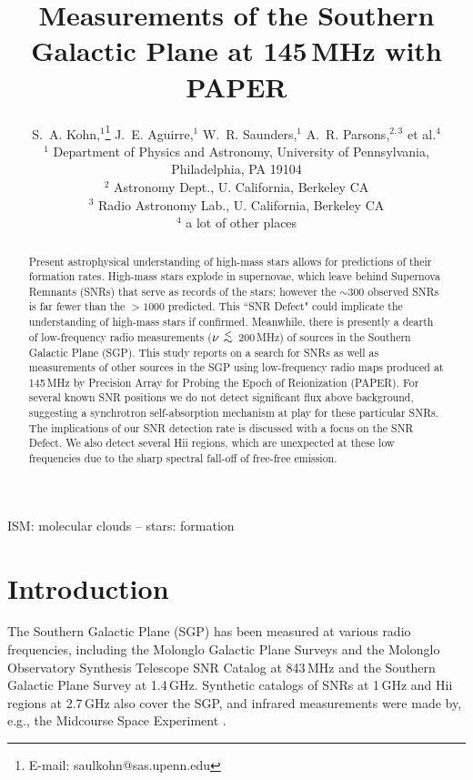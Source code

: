 \documentclass[useAMS,usenatbib]{mn2e}
\title[The SGP at 145\,MHz with PAPER]{Measurements of the Southern Galactic Plane at 145\,MHz with PAPER}
\author[S. A. Kohn et al.]{S.~A. Kohn,$^{1}$\thanks{E-mail: saulkohn@sas.upenn.edu} J.~E. Aguirre,$^{1}$ W.~R. Saunders,$^{1}$
A.~R. Parsons,$^{2,3}$
\newauthor et al.$^4$\\
$^{1}$ Department of Physics and Astronomy, University of Pennsylvania, Philadelphia, PA 19104\\
$^{2}$ Astronomy Dept., U. California, Berkeley CA\\
$^{3}$ Radio Astronomy Lab., U. California, Berkeley CA\\
$^{4}$ a lot of other places\\
}
\newcommand {\aplt} {\ {\raise-.5ex\hbox{$\buildrel<\over\sim$}}\ }
\begin{document}
\date{}

\maketitle
\begin{abstract}
Present astrophysical understanding of high-mass stars allows for predictions of their formation rates.  High-mass stars explode in supernovae, which leave behind Supernova Remnants (SNRs) that serve as records of the stars; however the $\sim$300 observed SNRs is far fewer than the $>1000$ predicted.  This ``SNR Defect" could implicate the understanding of high-mass stars if confirmed. 
Meanwhile, there is presently a dearth of low-frequency radio measurements ($\nu\aplt$200\,MHz) of sources in the Southern Galactic Plane (SGP).
This study reports on a search for SNRs as well as measurements of other sources in the SGP using low-frequency radio maps produced at 145\,MHz by Precision Array for Probing the Epoch of Reionization (PAPER).
For several known SNR positions we do not detect significant flux above background, suggesting a synchrotron self-absorption mechanism at play for these particular SNRs. The implications of our SNR detection rate is discussed with a focus on the SNR Defect. We also detect several H{\sc ii} regions, which are unexpected at these low frequencies due to the sharp spectral fall-off of free-free emission. 
\end{abstract}

\begin{keywords}
ISM: molecular clouds -- stars: formation
\end{keywords}

\section{Introduction}
\label{sec:intro}
The Southern Galactic Plane (SGP) has been measured at various radio frequencies, including the Molonglo Galactic Plane Surveys \citep[MGPS-1 and 2;][]{Green.99,Murphy.07} and the Molonglo Observatory Synthesis Telescope SNR Catalog \citep[MOSTSNRCAT;][]{Whiteoak.96} at 843\,MHz and the Southern Galactic Plane Survey \citep[SGPS;][]{Haverkorn.06} at 1.4\,GHz. Synthetic catalogs of SNRs at 1\,GHz \citep[][hereafter G14]{DAGreen.14} and H{\sc ii} regions at 2.7\,GHz \citep[][hereafter P03]{Paladini.03} also cover the SGP, and infrared measurements were made by, e.g., the Midcourse Space Experiment \citep[MSX;][operating at 8.28--21.3\,$\mu$m (36.23--14.08\,THz)]{Egan.03}. 
\end{document}

